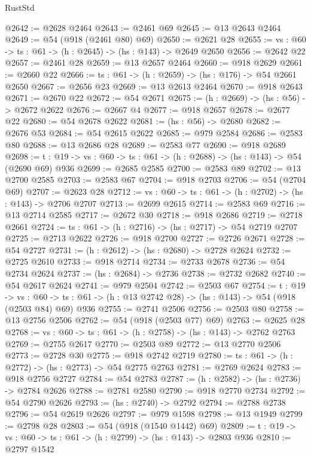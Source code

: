 \begin{lexlean}{RustStd}
\begin{coremodule}
@2642 := @2628 @2464
@2643 := @2461 @69
@2645 := @13 @2643 @2464
@2649 := @54 (@918 (@2461 @80) @69)
@2650 := @2621 @28
@2655 := {vs : @60} -> {ts : @61} -> (h : @2645) -> (hs : @143) -> @2649 @2650
@2656 := @2642 @22
@2657 := @2461 @28
@2659 := @13 @2657 @2464
@2660 := @918 @2629
@2661 := @2660 @22
@2666 := {ts : @61} -> (h : @2659) -> (hs : @176) -> @54 @2661 @2650
@2667 := @2656 @23
@2669 := @13 @2613 @2464
@2670 := @918 @2643
@2671 := @2670 @22
@2672 := @54 @2671
@2675 := (h : @2669) -> (hs : @56) -> @2672 @2622
@2676 := @2667 @4
@2677 := @918 @2657
@2678 := @2677 @22
@2680 := @54 @2678 @2622
@2681 := (hs : @56) -> @2680
@2682 := @2676 @53
@2684 := @54 @2615 @2622
@2685 := @979 @2584
@2686 := @2583 @80
@2688 := @13 @2686 @28
@2689 := @2583 @77
@2690 := @918 @2689
@2698 := {t : @19} -> {vs : @60} -> {ts : @61} -> (h : @2688) -> (hs : @143) -> @54 (@2690 @69) @936
@2699 := @2685 @2585
@2700 := @2583 @89
@2702 := @13 @2700 @2585
@2703 := @2583 @67
@2704 := @918 @2703
@2706 := @54 (@2704 @69)
@2707 := @2623 @28
@2712 := {vs : @60} -> {ts : @61} -> (h : @2702) -> (hs : @143) -> @2706 @2707
@2713 := @2699 @2615
@2714 := @2583 @69
@2716 := @13 @2714 @2585
@2717 := @2672 @30
@2718 := @918 @2686
@2719 := @2718 @2661
@2724 := {ts : @61} -> (h : @2716) -> (hs : @2717) -> @54 @2719 @2707
@2725 := @2713 @2622
@2726 := @918 @2700
@2727 := @2726 @2671
@2728 := @54 @2727
@2731 := (h : @2612) -> (hs : @2680) -> @2728 @2624
@2732 := @2725 @2610
@2733 := @918 @2714
@2734 := @2733 @2678
@2736 := @54 @2734 @2624
@2737 := (hs : @2684) -> @2736
@2738 := @2732 @2682
@2740 := @54 @2617 @2624
@2741 := @979 @2504
@2742 := @2503 @67
@2754 := {t : @19} ->
  {vs : @60} -> {ts : @61} -> (h : @13 @2742 @28) -> (hs : @143) -> @54 (@918 (@2503 @84) @69) @936
@2755 := @2741 @2506
@2756 := @2503 @80
@2758 := @13 @2756 @2506
@2762 := @54 (@918 (@2503 @77) @69)
@2763 := @2625 @28
@2768 := {vs : @60} -> {ts : @61} -> (h : @2758) -> (hs : @143) -> @2762 @2763
@2769 := @2755 @2617
@2770 := @2503 @89
@2772 := @13 @2770 @2506
@2773 := @2728 @30
@2775 := @918 @2742 @2719
@2780 := {ts : @61} -> (h : @2772) -> (hs : @2773) -> @54 @2775 @2763
@2781 := @2769 @2624
@2783 := @918 @2756 @2727
@2784 := @54 @2783
@2787 := (h : @2582) -> (hs : @2736) -> @2784 @2626
@2788 := @2781 @2580
@2790 := @918 @2770 @2734
@2792 := @54 @2790 @2626
@2793 := (hs : @2740) -> @2792
@2794 := @2788 @2738
@2796 := @54 @2619 @2626
@2797 := @979 @1598
@2798 := @13 @1949
@2799 := @2798 @28
@2803 := @54 (@918 (@1540 @1442) @69)
@2809 := {t : @19} -> {vs : @60} -> {ts : @61} -> (h : @2799) -> (hs : @143) -> @2803 @936
@2810 := @2797 @1542

\end{coremodule}
\end{lexlean}
